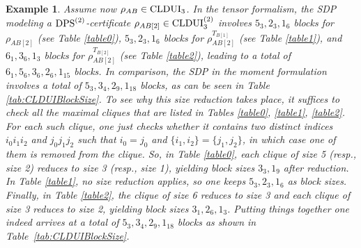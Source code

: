 \documentclass[11pt]{article}
\newcommand{\CLDUI}{\text{\rm CLDUI}}
\newcommand{\DPS}{\text{\rm DPS}}
\theoremstyle{plain}
\newtheorem{example}[satz]{Example}
\begin{document}
\begin{example}
\smallskip
Assume now $\rho_{AB}\in \CLDUI_3$.
In the tensor formalism, the SDP modeling a $\DPS^{(2)}$-certificate $\rho_{AB[2]}\in \CLDUI_3^{(2)}$ involves $5_3, 2_3,1_6$ blocks for $\rho_{AB[2]}$ (see Table \ref{table0}), $5_3,2_3,1_6$ blocks for $\rho_{AB[2]}^{T_{B[1]}}$ (see Table \ref{table1}), and $6_1,3_6,1_3$ blocks for $\rho_{AB[2]}^{T_{B[2]}}$ (see Table \ref{table2}), leading to a total of $6_1,5_6,3_6,2_6,1_{15}$ blocks. In comparison, the SDP in the moment formulation involves a total of $5_3,3_4,2_9,1_{18}$ blocks, as can be seen in Table \ref{tab:CLDUIBlockSize}. To see why this size reduction takes place, it suffices to check all the maximal cliques that are listed in Tables \ref{table0}, \ref{table1}, \ref{table2}. For each such clique, one just checks whether it contains two distinct  indices $i_0i_1i_2$  and $j_0j_1j_2$ such that $i_0=j_0$ and $\{i_1,i_2\}=\{j_1,j_2\}$, in which case one of them is removed from  the clique. So, in Table \ref{table0}, each clique of size 5 (resp., size 2) reduces to size 3 (resp., size 1), yielding block sizes $3_3,1_9$ after reduction. In Table \ref{table1}, no size reduction applies, so one keeps $5_3,2_3,1_6$ as block sizes.  Finally, in Table \ref{table2}, the clique of size 6 reduces to size 3 and each clique of size 3 reduces to size 2, yielding block sizes $3_1,2_6,1_3$. Putting things together one indeed arrives at a total of $5_3,3_4,2_9,1_{18}$ blocks as shown in Table~\ref{tab:CLDUIBlockSize}.
\end{example}
\end{document}
